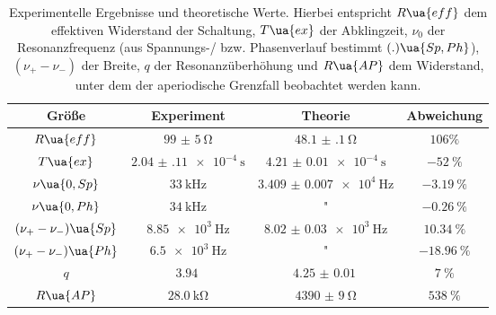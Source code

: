 \begin{table}
\centering
\caption{Experimentelle Ergebnisse und theoretische Werte. Hierbei entspricht $R\ua{eff}$ dem effektiven Widerstand der Schaltung,
$T\ua{ex}$ der Abklingzeit, $\nu_0$ der Resonanzfrequenz (aus Spannungs-/ bzw. Phasenverlauf bestimmt $(.)\ua{Sp, Ph}$), $(\nu_{+}-\nu_{-})$
der Breite, $q$ der Resonanzüberhöhung und $R\ua{AP}$ dem Widerstand, unter dem der aperiodische Grenzfall beobachtet werden kann.}
\label{tab: results}
\begin{tabular}{S |S |S |S}
\toprule
{Größe} & {Experiment} & {Theorie} & {Abweichung}   \\
\midrule
{$R\ua{eff}$} & {$\SI{99(5)}{\ohm}$} & {$\SI{48.1(1)}{\ohm}$} & {$106\%$}   \\
{$T\ua{ex}$} & {$\SI{2.04(11)e-4}{\second}$} & {$\SI{4.21(1)e-4}{\second}$} & {$\SI{-52}{\percent}$}   \\
{$\nu\ua{0, Sp}$} & {$\SI{33}{\kilo\hertz}$} & {$\SI{3.409(7)e4}{\hertz}$} & {$\SI{-3.19}{\percent}$}   \\
{$\nu\ua{0, Ph}$} & {$\SI{34}{\kilo\hertz}$} & " & {$\SI{-0.26}{\percent}$}   \\
{$(\nu_{+}-\nu_{-})\ua{Sp}$} & {$\SI{8.85e3}{\hertz}$} & {$\SI{8.02(3)e3}{\hertz}$} & {$\SI{10.34}{\percent}$}   \\
{$(\nu_{+}-\nu_{-})\ua{Ph}$} & {$\SI{6.5e3}{\hertz}$} & {"} & {$\SI{-18.96}{\percent}$}   \\
{ $q$ }  & { $\SI{3.94}{}$} & {$\SI{4.25(1)}{}$} & {$\SI{7}{\percent}$}   \\
{ $R\ua{AP}$ } & {$ \SI{28.0}{\kilo\ohm}$ } & { $\SI{4390(9)}{\ohm}$ } & { $\SI{538}{\percent}$ }   \\


\bottomrule
\end{tabular}
\end{table}
